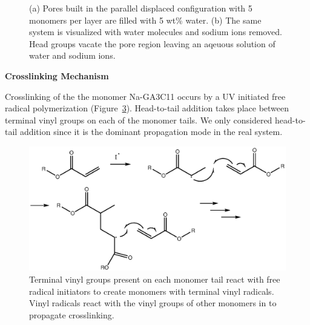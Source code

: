 \documentclass{article}
\begin{document}
\begin{figure}
\begin{subfigure}{0.45\textwidth}
                \caption{}\label{fig:water_removed}
        \end{subfigure}
  \caption{(a) Pores built in the parallel displaced configuration with 5
	  monomers per layer are filled with 5 wt\% water. (b) The same system is
	  visualized with water molecules and sodium ions removed. Head groups vacate the
	  pore region leaving an aqeuous solution of water and sodium ions.}\label{fig:water_pores}
  \end{figure}

  \noindent
  \begingroup
        \fontsize{14pt}{14pt}\selectfont
        \textbf{Crosslinking Mechanism}
  \endgroup

  \vspace{1em}
  Crosslinking of the the monomer Na-GA3C11 occurs by a UV initiated free
  radical polymerization (Figure~\ref{fig:xlink_mech}).  Head-to-tail addition
  takes place between terminal vinyl groups on each of the monomer tails.  We
  only considered head-to-tail addition since it is the dominant propagation mode
  in the real system.   

  \begin{figure}
  \centering
  \includegraphics[width=\textwidth]{Crosslink_mechanism.eps}
  \caption{Terminal vinyl groups present on each monomer tail react with free
	  radical initiators to create monomers with terminal vinyl radicals.  Vinyl
	  radicals react with the vinyl groups of other monomers in to propagate
	  crosslinking.}\label{fig:xlink_mech}
  \end{figure}

\clearpage

\end{document}
